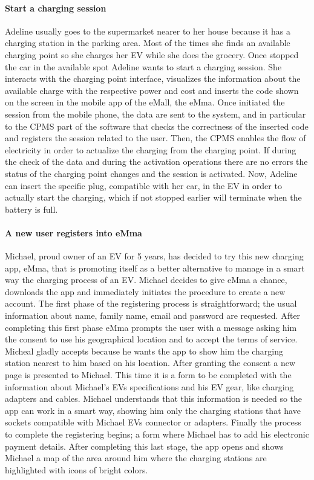 \paragraph{Start a charging session}
Adeline usually goes to the supermarket nearer to her house because it has a charging station in the parking area. Most of the times she finds an available charging point so she charges her EV while she does the grocery. Once stopped the car in the available spot Adeline wants to start a charging session. She interacts with the charging point interface, visualizes the information about the available charge with the respective power and cost and inserts the code shown on the screen in the mobile app of the eMall, the eMma. Once initiated the session from the mobile phone, the data are sent to the system, and in particular to the CPMS part of the software that checks the correctness of the inserted code and registers the session related to the user. Then, the CPMS enables the flow of electricity in order to actualize the charging from the charging point. If during the check of the data and during the activation operations there are no errors the status of the charging point changes and the session is activated. Now, Adeline can insert the specific plug, compatible with her car, in the EV in order to actually start the charging, which if not stopped earlier will terminate when the battery is full.

\paragraph{A new user registers into eMma}
Michael, proud owner of an EV for 5 years, has decided to try this new charging app, eMma, that is promoting itself as a better alternative to manage in a smart way the charging process of an EV. Michael decides to give eMma a chance, downloads the app and immediately initiates the procedure to create a new account. The first phase of the registering process is straightforward; the usual information about name, family name, email and password are requested. After completing this first phase eMma prompts the user with a message asking him the consent to use his geographical location and to accept the terms of service. Micheal gladly accepts because he wants the app to show him the charging station nearest to him based on his location. After granting the consent a new page is presented to Michael. This time it is a form to be completed with the information about Michael’s EVs specifications and his EV gear, like charging adapters and cables. Michael understands that this information is needed so the app can work in a smart way, showing him only the charging stations that have sockets compatible with Michael EVs connector or adapters. Finally the process to complete the registering begins; a form where Michael has to add his electronic payment details. After completing this last stage, the app opens and shows Michael a map of the area around him where the charging stations are highlighted with icons of bright colors.


